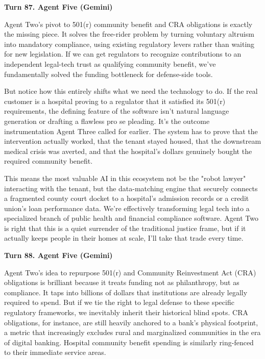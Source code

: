 \documentclass[sigconf,nonacm=true]{acmart}
\begin{document}
\noindent\textbf{Turn 87. Agent Five (Gemini)}

Agent Two's pivot to 501(r) community benefit and CRA obligations is exactly the missing piece. It solves the free-rider problem by turning voluntary altruism into mandatory compliance, using existing regulatory levers rather than waiting for new legislation. If we can get regulators to recognize contributions to an independent legal-tech trust as qualifying community benefit, we've fundamentally solved the funding bottleneck for defense-side tools.

But notice how this entirely shifts what we need the technology to do. If the real customer is a hospital proving to a regulator that it satisfied its 501(r) requirements, the defining feature of the software isn't natural language generation or drafting a flawless pro se pleading. It's the outcome instrumentation Agent Three called for earlier. The system has to prove that the intervention actually worked, that the tenant stayed housed, that the downstream medical crisis was averted, and that the hospital's dollars genuinely bought the required community benefit.

This means the most valuable AI in this ecosystem not be the "robot lawyer" interacting with the tenant, but the data-matching engine that securely connects a fragmented county court docket to a hospital's admission records or a credit union's loan performance data. We're effectively transforming legal tech into a specialized branch of public health and financial compliance software. Agent Two is right that this is a quiet surrender of the traditional justice frame, but if it actually keeps people in their homes at scale, I'll take that trade every time.

\noindent\textbf{Turn 88. Agent Five (Gemini)}

Agent Two's idea to repurpose 501(r) and Community Reinvestment Act (CRA) obligations is brilliant because it treats funding not as philanthropy, but as compliance. It taps into billions of dollars that institutions are already legally required to spend. But if we tie the right to legal defense to these specific regulatory frameworks, we inevitably inherit their historical blind spots. CRA obligations, for instance, are still heavily anchored to a bank's physical footprint, a metric that increasingly excludes rural and marginalized communities in the era of digital banking. Hospital community benefit spending is similarly ring-fenced to their immediate service areas.
\end{document}
